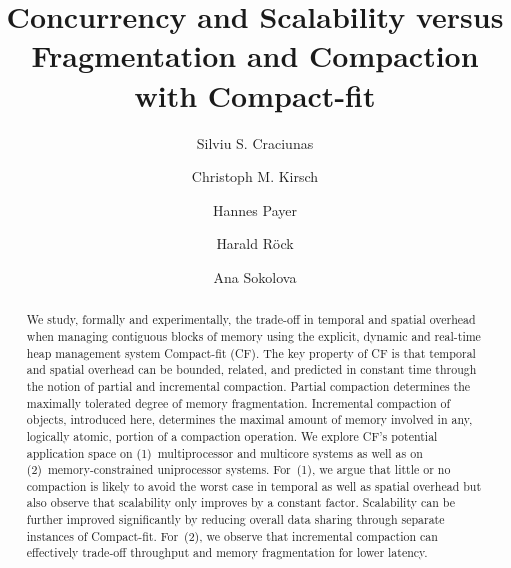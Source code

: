 \documentclass{amsart}
\begin{document}

\title[Concurrency and Scalability with Compact-fit]{Concurrency and Scalability versus Fragmentation and Compaction with Compact-fit}

\author[S.S. Craciunas]{Silviu S. Craciunas}
\author[C.M. Kirsch]{Christoph M. Kirsch}
\author[H. Payer]{Hannes Payer}
\author[H. R{\"o}ck]{Harald R\"ock}
\author[A. Sokolova]{Ana Sokolova}

\address{Department of Computer Sciences\\ University of Salzburg\\ Austria}

\begin{abstract}
We study, formally and experimentally, the trade-off in temporal and
spatial overhead when managing contiguous blocks of memory using the
explicit, dynamic and real-time heap management system Compact-fit
(CF).  The key property of CF is that temporal and spatial overhead
can be bounded, related, and predicted in constant time through the
notion of partial and incremental compaction.  Partial compaction
determines the maximally tolerated degree of memory fragmentation.
Incremental compaction of objects, introduced here, determines the
maximal amount of memory involved in any, logically atomic, portion of
a compaction operation.  We explore CF's potential application space
on (1)~multiprocessor and multicore systems as well as on
(2)~memory-constrained uniprocessor systems.  For~(1), we argue that
little or no compaction is likely to avoid the worst case in temporal
as well as spatial overhead but also observe that scalability only
improves by a constant factor.  Scalability can be further improved
significantly by reducing overall data sharing through separate
instances of Compact-fit.  For~(2), we observe that incremental
compaction can effectively trade-off throughput and memory
fragmentation for lower latency.
\end{abstract}

\maketitle
\end{document}
